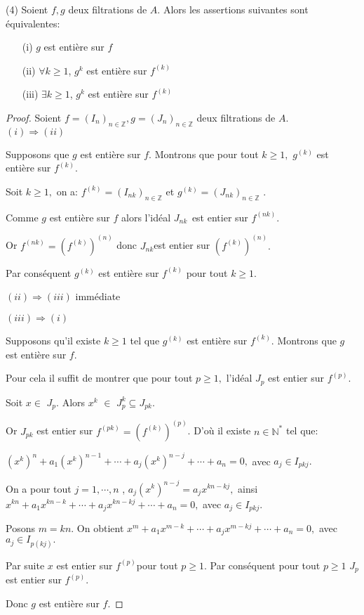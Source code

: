\begin{maproposition} (4)
	Soient $f,g$ deux filtrations de $A$. Alors les assertions suivantes sont équivalentes:
	\begin{enumerate}
		\item[(i)] $g$ est entière sur $f$
		\item[(ii)] $\forall k \geqslant 1$, $g^{k}$ est entière sur $f^{(k)}$
		\item[(iii)] $\exists k \geqslant 1$, $g^{k}$ est entière sur $f^{(k)}$
	\end{enumerate}
\end{maproposition}
\begin{proof}
	Soient $f=(I_n)_{n \in \mathbb{Z}},g=(J_n)_{n \in \mathbb{Z}}$ deux filtrations de $A$. \\
	$(i)\Longrightarrow (ii)$
	
	Supposons que $g$ est entière sur $f.$ Montrons que pour tout $k\geq 1,$ $g^{(k)}$ est entière sur $f^{(k)}.$
	
	Soit $k\geq 1,$ on a: $f^{(k)}=(I_{nk})_{n\in \mathbb{Z}}$ et $g^{(k)}=(J_{nk})_{n\in \mathbb{Z}}$ .
	
	Comme $g$ est entière sur $f$ alors l'idéal $J_{nk\text{ }}$est entier sur $f^{(nk)}.$
	
	Or $f^{(nk)}=(f^{(k)})^{(n)}$ donc $J_{nk}$est entier sur $(f^{(k)})^{(n)}.$
	
	Par conséquent $g^{(k)}$ est entière sur $f^{(k)}$ pour tout $k\geq 1.$
	
	$(ii)\Longrightarrow (iii)$ immédiate
	
	$(iii)\Longrightarrow (i)$
	
	Supposons qu'il existe $k\geq 1$ tel que $g^{(k)}$ est entière sur $f^{(k)}$. Montrons que $g$ est entière sur $f.$
	
	Pour cela il suffit de montrer que pour tout $p\geq 1,$ l'idéal $J_{p}$ est entier sur $f^{(p)}.$
	
	Soit $x\in $ $J_{p}.$ Alors $x^{k}$ $\in $ $J_{p}^{k}\subseteq J_{pk}.$
	
	Or $J_{pk}$ est entier sur $f^{(pk)}=(f^{(k)})^{(p)}$. D'où il existe $n\in \mathbb{N}^{\ast }$ tel que:
	
	$(x^{k})^{n}+a_{1}(x^{k})^{n-1}+\cdots +a_{j}(x^{k})^{n-j}+\cdots +a_{n}=0,$ avec $a_{j}\in I_{pkj}.$
	
	On a pour tout $j=1,\cdots ,n$ , $a_{j}(x^{k})^{n-j}=a_{j}x^{kn-kj},$ ainsi $x^{kn}+a_{1}x^{kn-k}+\cdots +a_{j}x^{kn-kj}+\cdots +a_{n}=0,$ avec $a_{j}\in I_{pkj}.$
	
	Posons $m=kn.$ On obtient $x^{m}+a_{1}x^{m-k}+\cdots +a_{j}x^{m-kj}+\cdots +a_{n}=0,$ avec $a_{j}\in I_{p(kj)}.$
	
	Par suite $x$ est entier sur $f^{(p)}$pour tout $p\geq 1.$ Par conséquent pour tout $p\geq 1$ $J_{p}$ est entier sur $f^{(p)}.$
	
	Donc $g$ est entière sur $f.$
	
\end{proof}

